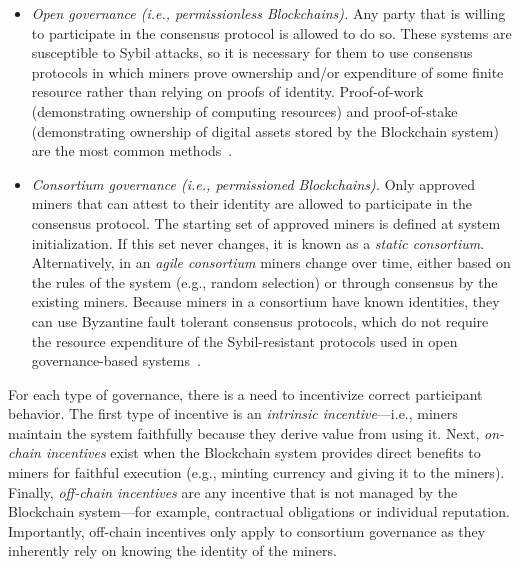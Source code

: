 \begin{itemize}
	\item \emph{Open governance (i.e., permissionless Blockchains).}
	Any party that is willing to participate in the consensus protocol is allowed to do so.
	These systems are susceptible to Sybil attacks, so it is necessary for them to use consensus protocols in which miners prove ownership and/or expenditure of some finite resource rather than relying on proofs of identity.
	Proof-of-work (demonstrating ownership of computing resources) and proof-of-stake (demonstrating ownership of digital assets stored by the Blockchain system) are the most common methods~\cite{Bano17,garay2018consensus}.
	
	\item \emph{Consortium governance (i.e., permissioned Blockchains).}
	Only approved miners that can attest to their identity are allowed to participate in the consensus protocol.
	The starting set of approved miners is defined at system initialization.
	If this set never changes, it is known as a \emph{static consortium}.
	Alternatively, in an \emph{agile consortium} miners change over time, either based on the rules of the system (e.g., random selection) or through consensus by the existing miners.
	Because miners in a consortium have known identities, they can use Byzantine fault tolerant consensus protocols, which do not require the resource expenditure of the Sybil-resistant protocols used in open governance-based systems~\cite{Bano17,garay2018consensus}.		
\end{itemize}

For each type of governance, there is a need to incentivize correct participant behavior.
The first type of incentive is an \emph{intrinsic incentive}---i.e., miners maintain the system faithfully because they derive value from using it.
Next, \emph{on-chain incentives} exist when the Blockchain system provides direct benefits to miners for faithful execution (e.g., minting currency and giving it to the miners).
Finally, \emph{off-chain incentives} are any incentive that is not managed by the Blockchain system---for example, contractual obligations or individual reputation.
Importantly, off-chain incentives only apply to consortium governance as they inherently rely on knowing the identity of the miners.


